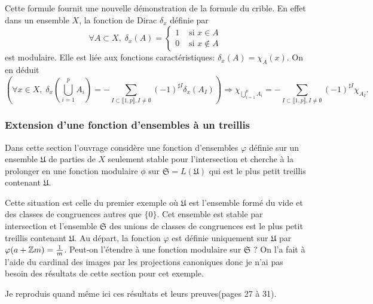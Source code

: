 \begin{rem}
  Cette formule fournit une nouvelle démonstration de la formule du crible. En effet dans un ensemble $X$, la fonction de Dirac $\delta_x$ définie par
  \begin{displaymath}
     \forall A \subset X, \;\delta_x(A) =
    \left\lbrace
    \begin{aligned}
      1 &\text{ si } x \in A \\
      0 &\text{ si } x \notin A
    \end{aligned}
    \right.
  \end{displaymath}
  est modulaire. Elle est liée aux fonctions caractéristiques: $\delta_x(A) = \chi_A(x)$. On en déduit
  \begin{displaymath}
    \left( \forall x \in X, \; \delta_x(\bigcup_{i=1}^p A_i) = - \sum_{I \subset \llbracket 1,p \rrbracket, I\neq \emptyset} (-1)^{\sharp I}\delta_x(A_I) \right)
    \Rightarrow  \chi_{\bigcup_{i=1}^p A_i} = - \sum_{I \subset \llbracket 1,p \rrbracket, I\neq \emptyset} (-1)^{\sharp I}\chi_{A_I}.
  \end{displaymath}
\end{rem}


\subsubsection{Extension d'une fonction d'ensembles à un treillis}
Dans cette section l'ouvrage considère une fonction d'ensembles $\varphi$ définie sur un ensemble $\mathfrak{U}$ de parties de $X$ seulement stable pour l'intersection et cherche à la prolonger en une fonction modulaire $\phi$ sur $\mathfrak{S} = L(\mathfrak{U})$ qui est le plus petit treillis contenant $\mathfrak{U}$.

Cette situation est celle du premier exemple où $\mathfrak{U}$ est l'ensemble formé du vide et des classes de congruences autres que $\{0\}$. Cet ensemble est stable par intersection et l'ensemble $\mathfrak{S}$ des unions de classes de congruences est le plus petit treillis contenant $\mathfrak{U}$.
Au départ, la fonction $\varphi$ est définie uniquement sur $\mathfrak{U}$ par  $\varphi(a + \mathbb{Z} m) = \frac{1}{m}$.
Peut-on l'étendre à une fonction modulaire sur $\mathfrak{S}$ ? On l'a fait à l'aide du cardinal des images par les projections canoniques donc je n'ai pas besoin des résultats de cette section pour cet exemple.

Je reproduis quand même ici ces résultats et leurs preuves(pages 27 à 31).

